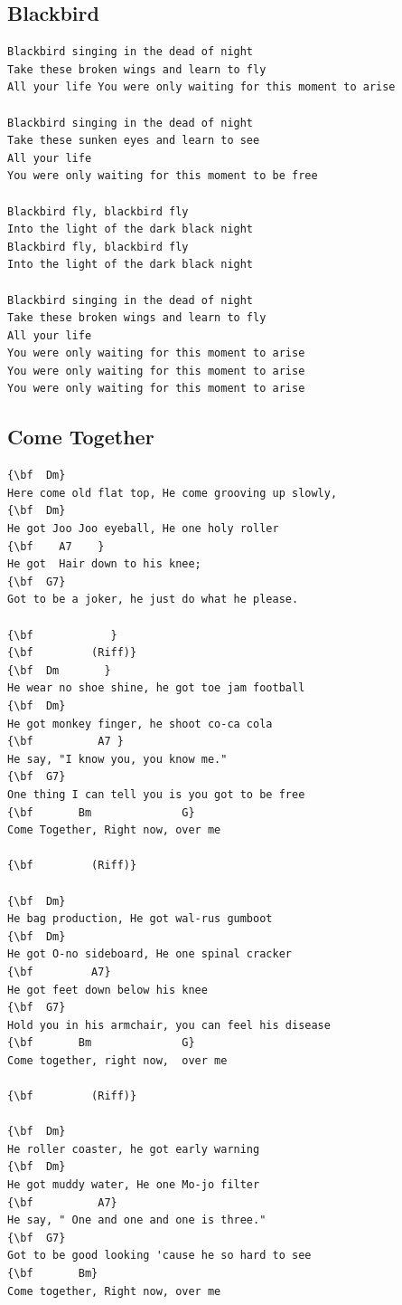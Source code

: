 \documentclass[a4paper]{article}
\begin{document}
\subsection{Blackbird}
\begin{Verbatim}[commandchars=\\\{\}]
Blackbird singing in the dead of night 
Take these broken wings and learn to fly 
All your life You were only waiting for this moment to arise

Blackbird singing in the dead of night 
Take these sunken eyes and learn to see 
All your life 
You were only waiting for this moment to be free

Blackbird fly, blackbird fly 
Into the light of the dark black night
Blackbird fly, blackbird fly 
Into the light of the dark black night

Blackbird singing in the dead of night 
Take these broken wings and learn to fly 
All your life 
You were only waiting for this moment to arise 
You were only waiting for this moment to arise 
You were only waiting for this moment to arise 

\end{Verbatim}
\newpage
\subsection{Come Together}
\begin{Verbatim}[commandchars=\\\{\}]
{\bf  Dm}
Here come old flat top, He come grooving up slowly,
{\bf  Dm}
He got Joo Joo eyeball, He one holy roller 
{\bf    A7    }
He got  Hair down to his knee;  
{\bf  G7}
Got to be a joker, he just do what he please.

{\bf            }
{\bf         (Riff)}
{\bf  Dm       }
He wear no shoe shine, he got toe jam football
{\bf  Dm}
He got monkey finger, he shoot co-ca cola
{\bf          A7 }
He say, "I know you, you know me."  
{\bf  G7}
One thing I can tell you is you got to be free
{\bf       Bm              G}
Come Together, Right now, over me

{\bf         (Riff)}

{\bf  Dm}
He bag production, He got wal-rus gumboot
{\bf  Dm}
He got O-no sideboard, He one spinal cracker
{\bf         A7}
He got feet down below his knee
{\bf  G7}
Hold you in his armchair, you can feel his disease 
{\bf       Bm              G}
Come together, right now,  over me

{\bf         (Riff)}

{\bf  Dm}
He roller coaster, he got early warning
{\bf  Dm}
He got muddy water, He one Mo-jo filter
{\bf          A7}
He say, " One and one and one is three."
{\bf  G7}
Got to be good looking 'cause he so hard to see 
{\bf       Bm}
Come together, Right now, over me

\end{Verbatim}
\newpage
\end{document}
